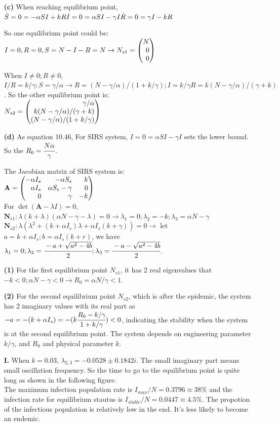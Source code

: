 \documentclass[12pt,a4paper]{article}
\begin{document}
\textbf{(c)}
When reaching equilibrium point, \\
$\dot{S} =0= -\alpha SI+kR\\
\dot{I} =0= \alpha SI - \gamma I\\
\dot{R} =0= \gamma I - kR$

So one equilibrium point could be: \\
$I=0,R=0,S=N-I-R=N\rightarrow N_{s1}=\newvec{N\\0\\0}$

When $I\neq 0;R\neq 0$, $I/R=k/\gamma;S=\gamma/\alpha\rightarrow R=(N-\gamma/\alpha)/(1+k/\gamma);I=k/\gamma R=k(N-\gamma/\alpha)/(\gamma+k)$. So the other equilibrium point is:\\
$N_{s2}=\newvec{\gamma/\alpha\\k(N-\gamma/\alpha)/(\gamma+k)\\(N-\gamma/\alpha)/(1+k/\gamma)}$

\textbf{(d)}
As equation 10.46, For SIRS system, $\dot{I}=0=\alpha SI-\gamma I$ sets the lower bound. So the $R_0=\cfrac{N\alpha}{\gamma}$. 

The Jacobian matrix  of SIRS system is: \\
$\mathbf{A}=\newvec{-\alpha I_s&-\alpha S_s&k\\\alpha I_s&\alpha S_s-\gamma&0\\0&\gamma&-k}$\\
For $\det(\mathbf{A}-\lambda I)=0$, \\
$\mathbf{N}_{s1}: \lambda(k+\lambda)(\alpha N-\gamma-\lambda)=0\rightarrow \lambda_1=0;\lambda_2=-k;\lambda_3=\alpha N-\gamma$ \\
$\mathbf{N}_{s2}: \lambda(\lambda^2+(k+\alpha I_s)\lambda+\alpha I_s (k+\gamma))=0\rightarrow$ let $a=k+\alpha I_s;b=\alpha I_s(k+r)$, we have $\lambda_1=0;\lambda_2=\cfrac{-a+\sqrt{a^2-4b}}{2};\lambda_3=\cfrac{-a-\sqrt{a^2-4b}}{2}$. 

\textbf{(1)} For the first equilibrium point $N_{s1}$, it has 2 real eigenvalues that $-k<0;\alpha N-\gamma<0\rightarrow R_0=\alpha N/\gamma<1$. 

\textbf{(2)} For the second equilibrium point $N_{s2}$, which is after the epidemic, the system has 2 imaginary values with its real part as $-a=-(k+\alpha I_s)=-(k\cfrac{R_0-k/\gamma}{1+k/\gamma}) < 0$, indicating the stability when the system is at the second equilibrium point. The system depends on engineering parameter $k/\gamma$, and $R_0$ and physical parameter $k$.

\textbf{I.} When $k=0.03$, $\lambda_{2,3}=-0.0528 \pm 0.1842i$. The small imaginary part means small oscillation frequency. So the time to go to the equilibrium point is quite long as shown in the following figure. \\
The maximum infection population rate is $I_{max}/N=0.3796\approx 38\%$ and the infection rate for equilibrium stautus is $I_{stable}/N=0.0447\approx 4.5\%$. The propotion of the infectious population is relatively low in the end. It's less likely to become an endemic. 
\end{document}
